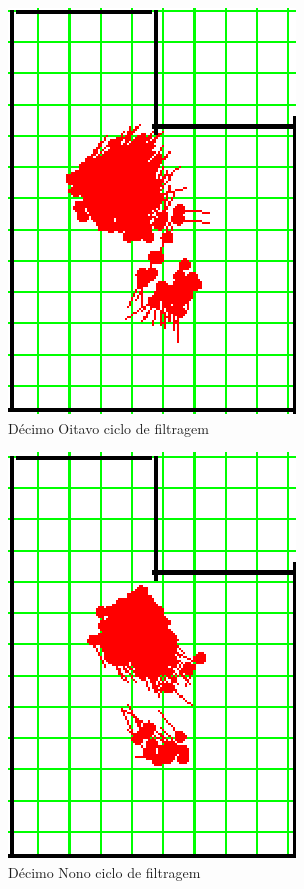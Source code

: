 \begin{figure}[H]
  \centering
  \includegraphics[scale=1]{figuras/cen1_ex3/19.eps}
  \caption[Décimo Oitavo Ciclo de Filtragem]{Décimo Oitavo ciclo de filtragem}
  \label{img:cen1_ex3_19}
\end{figure}

\begin{figure}[H]
  \centering
  \includegraphics[scale=1]{figuras/cen1_ex3/20.eps}
  \caption[Décimo Nono Ciclo de Filtragem]{Décimo Nono ciclo de filtragem}
  \label{img:cen1_ex3_20}
\end{figure}

